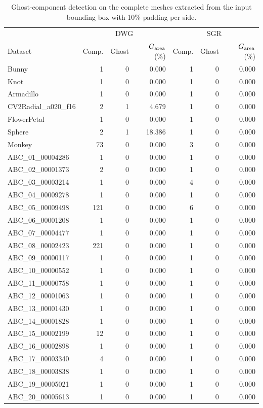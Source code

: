 \begin{table}[t]
\centering
\caption{Ghost-component detection on the complete meshes extracted from the input bounding box with 10\% padding per side.}
\label{tab:dwg-ghost}
\begin{tabular}{lrrrrrr}
\toprule
& \multicolumn{3}{c}{DWG} & \multicolumn{3}{c}{SGR} \\
Dataset & Comp. & Ghost & $G_{\rm area}$ (\%) & Comp. & Ghost & $G_{\rm area}$ (\%) \\
\midrule
Bunny & 1 & 0 & 0.000 & 1 & 0 & 0.000 \\
Knot & 1 & 0 & 0.000 & 1 & 0 & 0.000 \\
Armadillo & 1 & 0 & 0.000 & 1 & 0 & 0.000 \\
CV2Radial\_a020\_f16 & 2 & 1 & 4.679 & 1 & 0 & 0.000 \\
FlowerPetal & 1 & 0 & 0.000 & 1 & 0 & 0.000 \\
Sphere & 2 & 1 & 18.386 & 1 & 0 & 0.000 \\
Monkey & 73 & 0 & 0.000 & 3 & 0 & 0.000 \\
ABC\_01\_00004286 & 1 & 0 & 0.000 & 1 & 0 & 0.000 \\
ABC\_02\_00001373 & 2 & 0 & 0.000 & 1 & 0 & 0.000 \\
ABC\_03\_00003214 & 1 & 0 & 0.000 & 4 & 0 & 0.000 \\
ABC\_04\_00009278 & 1 & 0 & 0.000 & 1 & 0 & 0.000 \\
ABC\_05\_00009498 & 121 & 0 & 0.000 & 6 & 0 & 0.000 \\
ABC\_06\_00001208 & 1 & 0 & 0.000 & 1 & 0 & 0.000 \\
ABC\_07\_00004477 & 1 & 0 & 0.000 & 1 & 0 & 0.000 \\
ABC\_08\_00002423 & 221 & 0 & 0.000 & 1 & 0 & 0.000 \\
ABC\_09\_00000117 & 1 & 0 & 0.000 & 1 & 0 & 0.000 \\
ABC\_10\_00000552 & 1 & 0 & 0.000 & 1 & 0 & 0.000 \\
ABC\_11\_00000758 & 1 & 0 & 0.000 & 1 & 0 & 0.000 \\
ABC\_12\_00001063 & 1 & 0 & 0.000 & 1 & 0 & 0.000 \\
ABC\_13\_00001430 & 1 & 0 & 0.000 & 1 & 0 & 0.000 \\
ABC\_14\_00001828 & 1 & 0 & 0.000 & 1 & 0 & 0.000 \\
ABC\_15\_00002199 & 12 & 0 & 0.000 & 1 & 0 & 0.000 \\
ABC\_16\_00002898 & 1 & 0 & 0.000 & 1 & 0 & 0.000 \\
ABC\_17\_00003340 & 4 & 0 & 0.000 & 1 & 0 & 0.000 \\
ABC\_18\_00003838 & 1 & 0 & 0.000 & 1 & 0 & 0.000 \\
ABC\_19\_00005021 & 1 & 0 & 0.000 & 1 & 0 & 0.000 \\
ABC\_20\_00005613 & 1 & 0 & 0.000 & 1 & 0 & 0.000 \\
\bottomrule
\end{tabular}
\end{table}
